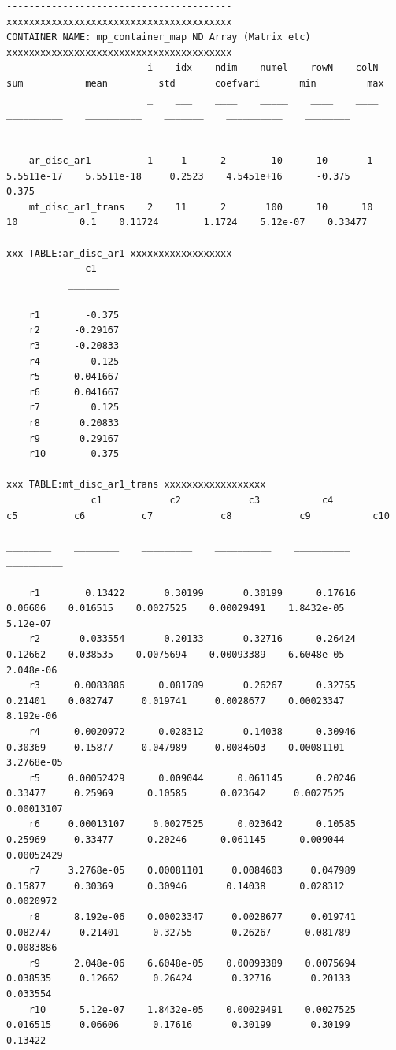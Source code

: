 \documentclass[
]{book}
\begin{document}
\begin{verbatim}
----------------------------------------
xxxxxxxxxxxxxxxxxxxxxxxxxxxxxxxxxxxxxxxx
CONTAINER NAME: mp_container_map ND Array (Matrix etc)
xxxxxxxxxxxxxxxxxxxxxxxxxxxxxxxxxxxxxxxx
                         i    idx    ndim    numel    rowN    colN       sum           mean         std       coefvari       min         max  
                         _    ___    ____    _____    ____    ____    __________    __________    _______    __________    ________    _______

    ar_disc_ar1          1     1      2        10      10       1     5.5511e-17    5.5511e-18     0.2523    4.5451e+16      -0.375      0.375
    mt_disc_ar1_trans    2    11      2       100      10      10             10           0.1    0.11724        1.1724    5.12e-07    0.33477

xxx TABLE:ar_disc_ar1 xxxxxxxxxxxxxxxxxx
              c1    
           _________

    r1        -0.375
    r2      -0.29167
    r3      -0.20833
    r4        -0.125
    r5     -0.041667
    r6      0.041667
    r7         0.125
    r8       0.20833
    r9       0.29167
    r10        0.375

xxx TABLE:mt_disc_ar1_trans xxxxxxxxxxxxxxxxxx
               c1            c2            c3           c4           c5          c6          c7            c8            c9           c10    
           __________    __________    __________    _________    ________    ________    _________    __________    __________    __________

    r1        0.13422       0.30199       0.30199      0.17616     0.06606    0.016515    0.0027525    0.00029491    1.8432e-05      5.12e-07
    r2       0.033554       0.20133       0.32716      0.26424     0.12662    0.038535    0.0075694    0.00093389    6.6048e-05     2.048e-06
    r3      0.0083886      0.081789       0.26267      0.32755     0.21401    0.082747     0.019741     0.0028677    0.00023347     8.192e-06
    r4      0.0020972      0.028312       0.14038      0.30946     0.30369     0.15877     0.047989     0.0084603    0.00081101    3.2768e-05
    r5     0.00052429      0.009044      0.061145      0.20246     0.33477     0.25969      0.10585      0.023642     0.0027525    0.00013107
    r6     0.00013107     0.0027525      0.023642      0.10585     0.25969     0.33477      0.20246      0.061145      0.009044    0.00052429
    r7     3.2768e-05    0.00081101     0.0084603     0.047989     0.15877     0.30369      0.30946       0.14038      0.028312     0.0020972
    r8      8.192e-06    0.00023347     0.0028677     0.019741    0.082747     0.21401      0.32755       0.26267      0.081789     0.0083886
    r9      2.048e-06    6.6048e-05    0.00093389    0.0075694    0.038535     0.12662      0.26424       0.32716       0.20133      0.033554
    r10      5.12e-07    1.8432e-05    0.00029491    0.0027525    0.016515     0.06606      0.17616       0.30199       0.30199       0.13422


\end{verbatim}
\end{document}
